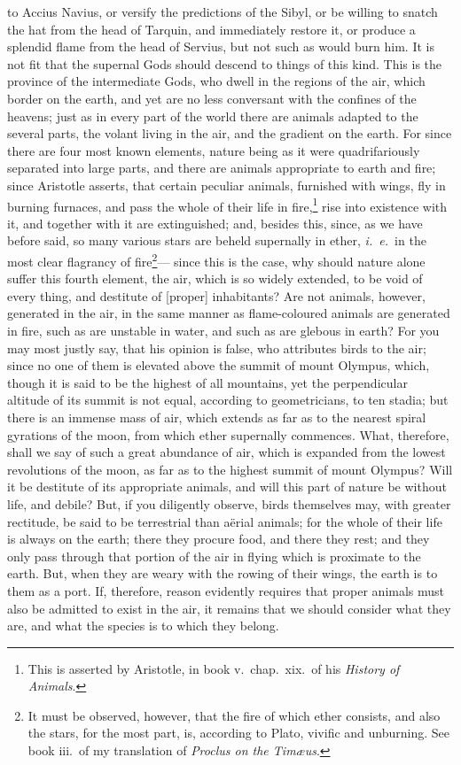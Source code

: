 \documentclass[twoside]{article}
\begin{document}
to Accius Navius, or versify the predictions of the Sibyl, or be willing to
snatch the hat from the head of Tarquin, and immediately restore it, or produce
a splendid flame from the head of Servius, but not such as would burn him. It
is not fit that the supernal Gods should descend to things of this kind. This
is the province of the intermediate Gods, who dwell in the regions of the air,
which border on the earth, and yet are no less conversant with the confines of
the heavens; just as in every part of the world there are animals adapted to
the several parts, the volant living in the air, and the gradient on the earth.
For since there are four most known elements, nature being as it were
quadrifariously separated into large parts, and there are animals appropriate
to earth and fire; since Aristotle asserts, that certain peculiar animals,
furnished with wings, fly in burning furnaces, and pass the whole of their life
in fire,\footnote{This is asserted by Aristotle, in book v.~chap.~xix.~of his
\textit{History of Animals}.} rise into existence with it, and together with it
are extinguished; and, besides this, since, as we have before said, so many
various stars are beheld supernally in ether, \textit{i.~e.}~in the most clear
flagrancy of fire\footnote{It must be observed, however, that the fire of which
ether consists, and also the stars, for the most part, is, according to Plato,
vivific and unburning. See book iii.~of my translation of \textit{Proclus on
the Tim{\ae}us}.}--- since this is the case, why should nature alone suffer
this fourth element, the air, which is so widely extended, to be void of every
thing, and destitute of [proper] inhabitants?  Are not animals, however,
generated in the air, in the same manner as flame-coloured animals are
generated in fire, such as are unstable in water, and such as are glebous in
earth? For you may most justly say, that his opinion is false, who attributes
birds to the air; since no one of them is elevated above the summit of mount
Olympus, which, though it is said to be the highest of all mountains, yet the
perpendicular altitude of its summit is not equal, according to geometricians,
to ten stadia; but there is an immense mass of air, which extends as far as to
the nearest spiral gyrations of the moon, from which ether supernally
commences. What, therefore, shall we say of such a great abundance of air,
which is expanded from the lowest revolutions of the moon, as far as to the
highest summit of mount Olympus? Will it be destitute of its appropriate
animals, and will this part of nature be without life, and debile? But, if you
diligently observe, birds themselves may, with greater rectitude, be said to be
terrestrial than a\"{e}rial animals; for the whole of their life is always on
the earth; there they procure food, and there they rest; and they only pass
through that portion of the air in flying which is proximate to the earth. But,
when they are weary with the rowing of their wings, the earth is to them as a
port. If, therefore, reason evidently requires that proper animals must also be
admitted to exist in the air, it remains that we should consider what they are,
and what the species is to which they belong.
\end{document}
